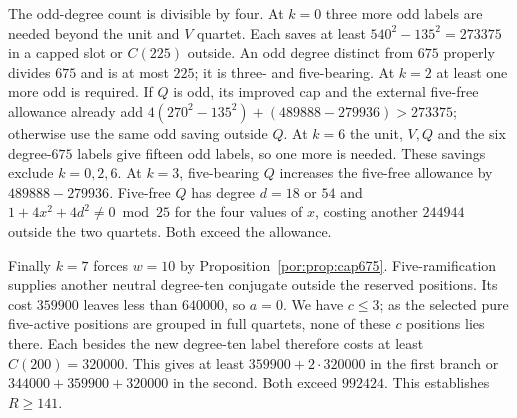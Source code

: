 \documentclass[11pt,a4paper]{article}
\numberwithin{equation}{section}
\theoremstyle{remark}
\begin{document}
The odd-degree count is divisible by four. At $k=0$ three more odd labels are needed beyond the unit and $V$ quartet. Each saves at least $540^2-135^2=273375$ in a capped slot or $C(225)$ outside. An odd degree distinct from $675$ properly divides $675$ and is at most $225$; it is three- and five-bearing. At $k=2$ at least one more odd is required. If $Q$ is odd, its improved cap and the external five-free allowance already add $4(270^2-135^2)+(489888-279936)>273375$; otherwise use the same odd saving outside $Q$. At $k=6$ the unit, $V,Q$ and the six degree-$675$ labels give fifteen odd labels, so one more is needed. These savings exclude $k=0,2,6$. At $k=3$, five-bearing $Q$ increases the five-free allowance by $489888-279936$. Five-free $Q$ has degree $d=18$ or $54$ and $1+4x^2+4d^2\ne0\bmod25$ for the four values of $x$, costing another $244944$ outside the two quartets. Both exceed the allowance.

Finally $k=7$ forces $w=10$ by Proposition~\ref{por:prop:cap675}. Five-ramification supplies another neutral degree-ten conjugate outside the reserved positions. Its cost $359900$ leaves less than $640000$, so $a=0$. We have $c\le3$; as the selected pure five-active positions are grouped in full quartets, none of these $c$ positions lies there. Each besides the new degree-ten label therefore costs at least $C(200)=320000$. This gives at least $359900+2\cdot320000$ in the first branch or $344000+359900+320000$ in the second. Both exceed $992424$. This establishes $R\ge141$.
\end{document}
